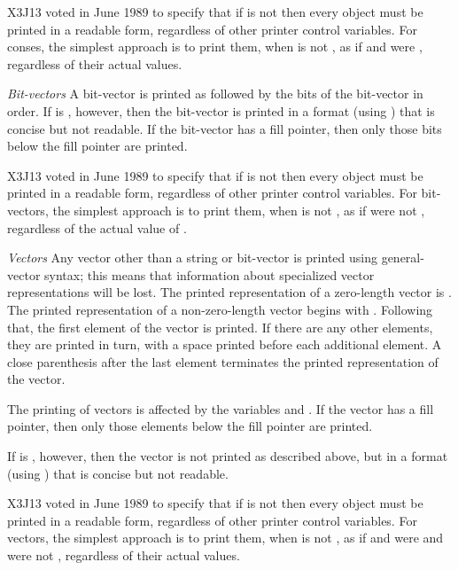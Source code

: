 \begin{flushdesc}
\begin{newer}
X3J13 voted in June 1989  to specify that if 
is not {\false} then every object must be printed in a readable form,
regardless of other printer control variables.  For conses, the simplest approach
is to print them, when  is not {\false}, as if 
and  were {\false}, regardless of their actual values.
\end{newer}

\begin{obsolete}
\item[\emph{Bit-vectors}]
A bit-vector is printed as \cd{\#*} followed by the bits of the bit-vector
in order.  If  is {\false}, however, then the bit-vector is
printed in a format (using \cd{\#<}) that is concise but not readable.
If the bit-vector has a fill pointer, then only those bits below
the fill pointer are printed.
\end{obsolete}
\begin{newer}
X3J13 voted in June 1989  to specify that if 
is not {\false} then every object must be printed in a readable form,
regardless of other printer control variables.  For bit-vectors, the simplest approach
is to print them, when  is not {\false}, as if 
were not {\false}, regardless of the actual value of .
\end{newer}

\item[\emph{Vectors}]
Any vector other than a string or bit-vector is printed using
general-vector syntax; this means that information
about specialized vector representations will be lost.
The printed representation of a zero-length vector is \cd{\#()}.  The
printed representation of a non-zero-length vector begins with \cd{\#(}.
Following that, the first element of the vector is printed.  If
there are any other elements, they are printed in turn, with a space
printed before each additional element.  A close parenthesis
after the
last element terminates the printed representation of the vector.
\begin{obsolete}
The
printing of vectors is affected by the variables  and
.
If the vector has a fill pointer, then only those elements below
the fill pointer are printed.

If  is {\false}, however, then the vector is not printed
as described above, but
in a format (using \cd{\#<}) that is concise but not readable.
\end{obsolete}
\begin{newer}
X3J13 voted in June 1989  to specify that if 
is not {\false} then every object must be printed in a readable form,
regardless of other printer control variables.  For vectors, the simplest approach
is to print them, when  is not {\false}, as if 
and  were {\false} and  were not {\false},
regardless of their actual values.
\end{newer}


\end{flushdesc}
